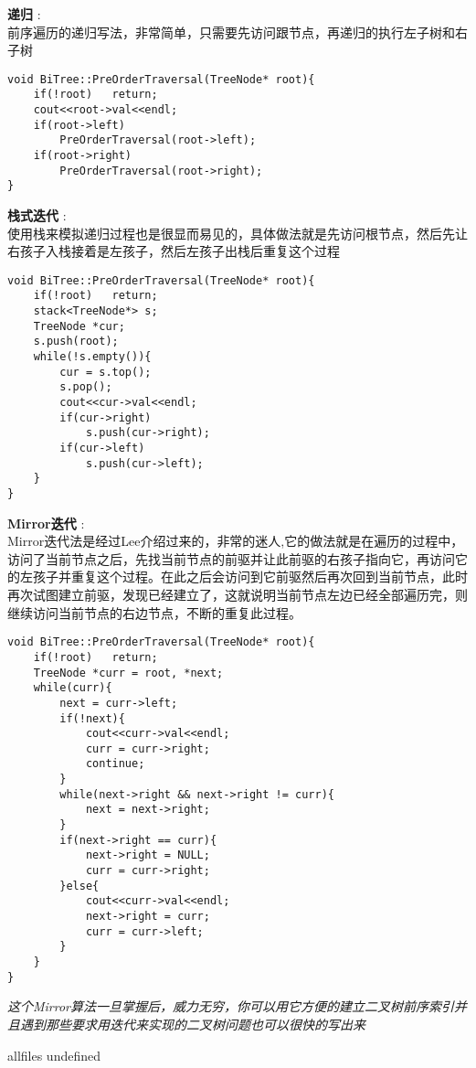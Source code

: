 \documentclass{article}
\begin{document}
\begin{CJK}{UTF8}{gbsn}     %

\else
	
\begin{description}
	\item{\textbf{递归}} : 
	\\前序遍历的递归写法，非常简单，只需要先访问跟节点，再递归的执行左子树和右子树
	\begin{lstlisting}
void BiTree::PreOrderTraversal(TreeNode* root){
	if(!root)	return;
	cout<<root->val<<endl;
	if(root->left)
		PreOrderTraversal(root->left);
	if(root->right)
		PreOrderTraversal(root->right);
}
	\end{lstlisting}
	\item{\textbf{栈式迭代}} : 
	\\使用栈来模拟递归过程也是很显而易见的，具体做法就是先访问根节点，然后先让右孩子入栈接着是左孩子，然后左孩子出栈后重复这个过程
	\begin{lstlisting}
void BiTree::PreOrderTraversal(TreeNode* root){
	if(!root)	return;
	stack<TreeNode*> s;
	TreeNode *cur;
	s.push(root);
	while(!s.empty()){
		cur = s.top();
		s.pop();
		cout<<cur->val<<endl;
		if(cur->right)
			s.push(cur->right);
		if(cur->left)
			s.push(cur->left);
	}
}
	\end{lstlisting}
	\item{\textbf{Mirror迭代}} : 
	\\Mirror迭代法是经过Lee介绍过来的，非常的迷人,它的做法就是在遍历的过程中，访问了当前节点之后，先找当前节点的前驱并让此前驱的右孩子指向它，再访问它的左孩子并重复这个过程。在此之后会访问到它前驱然后再次回到当前节点，此时再次试图建立前驱，发现已经建立了，这就说明当前节点左边已经全部遍历完，则继续访问当前节点的右边节点，不断的重复此过程。
	\begin{lstlisting}
void BiTree::PreOrderTraversal(TreeNode* root){
	if(!root)	return;
	TreeNode *curr = root, *next;
	while(curr){
		next = curr->left;
		if(!next){
			cout<<curr->val<<endl;
			curr = curr->right;
			continue;
		}
		while(next->right && next->right != curr){
			next = next->right;
		}
		if(next->right == curr){
			next->right = NULL;
			curr = curr->right;
		}else{
			cout<<curr->val<<endl;
			next->right = curr;
			curr = curr->left;
		}
	}
}
	\end{lstlisting}
	\textit{这个Mirror算法一旦掌握后，威力无穷，你可以用它方便的建立二叉树前序索引并且遇到那些要求用迭代来实现的二叉树问题也可以很快的写出来}
\end{description}

\fi

\ifx allfiles undefined
\end{CJK}
\end{document}
